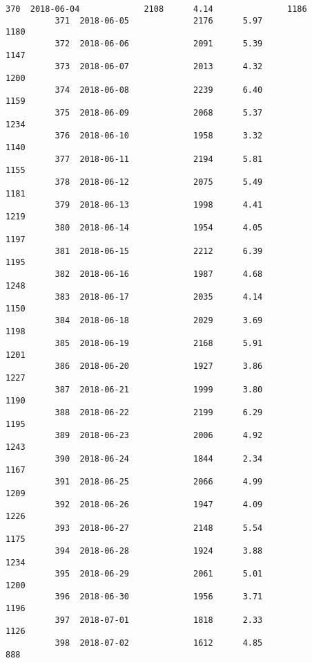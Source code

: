 \documentclass[11pt]{article}
\begin{document}
\begin{Verbatim}[commandchars=\\\{\}]
          370  2018-06-04             2108      4.14               1186   
          371  2018-06-05             2176      5.97               1180   
          372  2018-06-06             2091      5.39               1147   
          373  2018-06-07             2013      4.32               1200   
          374  2018-06-08             2239      6.40               1159   
          375  2018-06-09             2068      5.37               1234   
          376  2018-06-10             1958      3.32               1140   
          377  2018-06-11             2194      5.81               1155   
          378  2018-06-12             2075      5.49               1181   
          379  2018-06-13             1998      4.41               1219   
          380  2018-06-14             1954      4.05               1197   
          381  2018-06-15             2212      6.39               1195   
          382  2018-06-16             1987      4.68               1248   
          383  2018-06-17             2035      4.14               1150   
          384  2018-06-18             2029      3.69               1198   
          385  2018-06-19             2168      5.91               1201   
          386  2018-06-20             1927      3.86               1227   
          387  2018-06-21             1999      3.80               1190   
          388  2018-06-22             2199      6.29               1195   
          389  2018-06-23             2006      4.92               1243   
          390  2018-06-24             1844      2.34               1167   
          391  2018-06-25             2066      4.99               1209   
          392  2018-06-26             1947      4.09               1226   
          393  2018-06-27             2148      5.54               1175   
          394  2018-06-28             1924      3.88               1234   
          395  2018-06-29             2061      5.01               1200   
          396  2018-06-30             1956      3.71               1196   
          397  2018-07-01             1818      2.33               1126   
          398  2018-07-02             1612      4.85                888   
          

\end{Verbatim}
\end{document}
